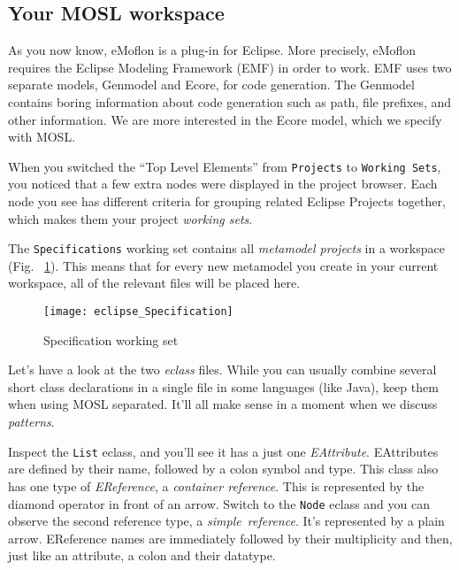 \newpage
\texHeader

\subsection{Your MOSL workspace}

\hypertarget{projectStructure tex}{}
As you now know, eMoflon is a plug-in for Eclipse. More precisely, eMoflon requires the Eclipse Modeling Framework (EMF) in order to work. EMF uses two separate
models, Genmodel and Ecore, for code generation. The Genmodel contains boring information about code generation such as path, file prefixes, and other
information. We are more interested in the Ecore model, which we specify with MOSL.

When you switched the ``Top Level Elements'' from \texttt{Projects} to \texttt{Working Sets}, you noticed that a few extra nodes were displayed in the project
browser. Each node you see has different criteria for grouping related Eclipse Projects together, which makes them your project \emph{working sets}.

The \texttt{Specifications} working set contains all \emph{metamodel projects} in a workspace (Fig. ~\ref{fig_modelSpecification}). This means that for every
new metamodel you create in your current workspace, all of the relevant files will be placed here.

 \begin{figure}[htbp]
  \centering
  \texttt{[image: eclipse\_Specification]}
  \caption{Specification working set}
  \label{fig_modelSpecification}
\end{figure}
  
Let's have a look at the two \emph{eclass} files. While you can usually combine several short class declarations in a single file in some languages (like Java),
keep them when using MOSL separated. It'll all make sense in a moment when we discuss \emph{patterns}.


Inspect the \texttt{List} eclass, and you'll see it has a just one \emph{EAttribute}. EAttributes are defined by their name, followed by a colon symbol and
type. This class also has one type of \emph{EReference}, a \emph{container reference}. This is represented by the diamond operator in front of an arrow. Switch
to the \texttt{Node} eclass and you can observe the second reference type, a \emph{simple~reference}. It's represented by a plain arrow. EReference names are
immediately followed by their multiplicity and then, just like an attribute, a colon and their datatype.


